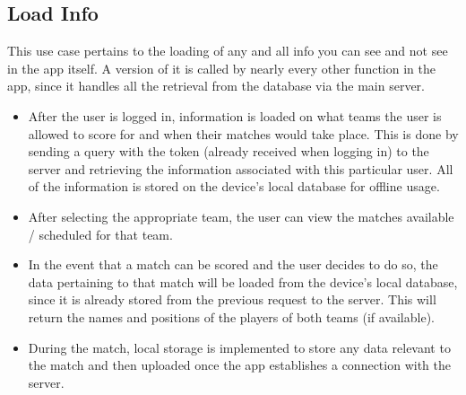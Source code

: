 \documentclass[hidelinks,a4paper,12pt]{article}
\begin{document}
	\subsection{Load Info}
		This use case pertains to the loading of any and all info you can see and not see in the app itself. A version of it is called by nearly every other function in the app, since it handles all the retrieval from the database via the main server.
		\begin{itemize}
			\item After the user is logged in, information is loaded on what teams the user is allowed to score for and when their matches would take place. This is done by sending a query with the token (already received when logging in) to the server and retrieving the information associated with this particular user. All of the information is stored on the device's local database for offline usage.
			\item After selecting the appropriate team, the user can view the matches available / scheduled for that team.
			\item In the event that a match can be scored and the user decides to do so, the data pertaining to that match will be loaded from the device's local database, since it is already stored from the previous request to the server. This will return the names and positions of the players of both teams (if available).
			\item During the match, local storage is implemented to store any data relevant to the match and then uploaded once the app establishes a connection with the server.
		\end{itemize}
\end{document}
